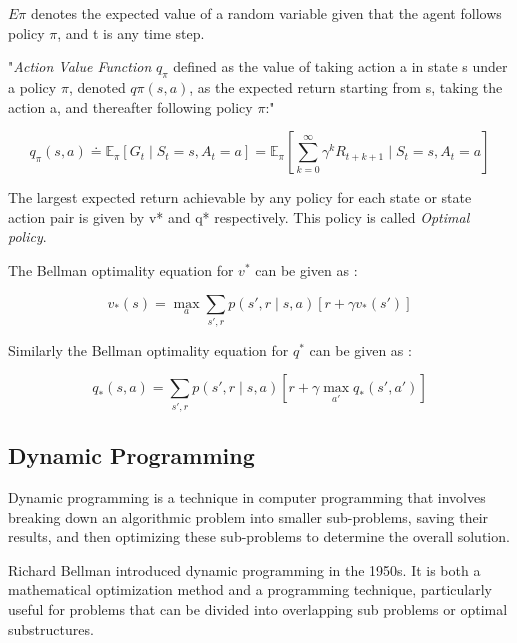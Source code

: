 \documentclass[a4paper,12pt]{Classes/RoboticsLaTeX}
\begin{document}
    $E\pi$ denotes the expected value of a random variable given that the agent follows
    policy $\pi$, and t is any time step.

    "\textit{Action Value Function} $q_\pi$ defined as  the value of taking action a in state s under a policy $\pi$, denoted
    $q\pi(s, a)$, as the expected return starting from s, taking the action a, and thereafter
    following policy $\pi$:" \cite{Sutton_Barto_2020}
    
    \begin{equation}
     q_\pi(s, a) \doteq \mathbb{E}_\pi \left[ G_t \mid S_t = s, A_t = a \right] = \mathbb{E}_\pi \left[ \sum_{k=0}^{\infty} \gamma^k R_{t+k+1} \mid S_t = s, A_t = a \right]
    \end{equation}

    The largest expected return achievable by any policy for each state or state action pair is given by v* and q* respectively. This policy is called \textit{Optimal policy}.\cite{Sutton_Barto_2020}

    The Bellman optimality equation for $v^*$ can be given as :

   \begin{equation}
      v_*(s) = \max_a \sum_{s', r} p(s', r \mid s, a) \left[ r + \gamma v_*(s') \right]
   \end{equation}
  
    Similarly the Bellman optimality equation for $q^*$ can be given as : 
    
    \begin{equation}
    q_*(s, a) = \sum_{s', r} p(s', r \mid s, a) \left[ r + \gamma \max_{a'} q_*(s', a') \right]
   \end{equation}

     \subsection{Dynamic Programming}

     Dynamic programming is a technique in computer programming that involves breaking down an algorithmic problem into smaller sub-problems, saving their results, and then optimizing these sub-problems to determine the overall solution.\cite{bellman1966dynamic}

    Richard Bellman introduced dynamic programming in the 1950s. It is both a mathematical optimization method and a programming technique, particularly useful for problems that can be divided into overlapping sub problems or optimal substructures.
\end{document}
